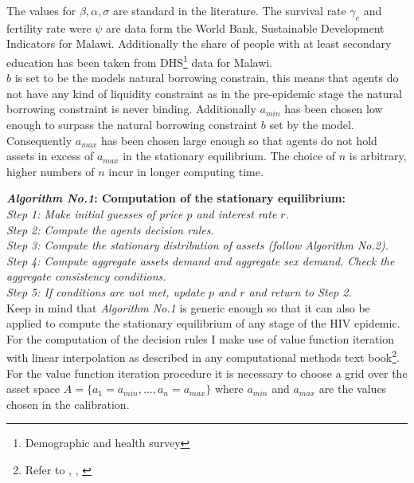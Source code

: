 The values for $\beta, \alpha, \sigma$ are standard in the literature. The survival rate $\gamma_{e}$ and fertility rate were $\psi$ are data form the World Bank, Sustainable Development Indicators for Malawi. Additionally the share of people with at least secondary education has been taken from DHS\footnote{Demographic and health survey} data for Malawi.\\

$b$ is set to be the models natural borrowing constrain, this means that agents do not have any kind of liquidity constraint as in the pre-epidemic stage the natural borrowing constraint is never binding. Additionally $a_{min}$ has been chosen low enough to surpass the natural borrowing constraint $b$ set by the model. Consequently $a_{max}$ has been chosen large enough so that agents do not hold assets in excess of $a_{max}$ in the stationary equilibrium. The choice of $n$ is arbitrary, higher numbers of $n$ incur in longer computing time.

\noindent \textbf{\textit{Algorithm No.1}: Computation of the stationary equilibrium:}\\

\noindent\textit{Step 1: Make initial guesses of price $p$ and interest rate $r$.\\
Step 2: Compute the agents decision rules.\\
Step 3: Compute the stationary distribution of assets (follow Algorithm No.2).\\
Step 4: Compute aggregate assets demand and aggregate sex demand. Check the aggregate consistency conditions.\\
Step 5: If conditions are not met, update $p$ and $r$ and return to Step 2. 
}\\

Keep in mind that \textit{Algorithm No.1} is generic enough so that it can also be applied to compute the stationary equilibrium of any stage of the HIV epidemic.\\

For the computation of the decision rules I make use of value function iteration with linear interpolation as described in any computational methods text book\footnote{Refer to \cite{mauss}, \cite{judd}, \cite{sargent}}. For the value function iteration procedure it is necessary to choose a grid over the asset space $A=\{a_{1}=a_{min},...,a_{n}=a_{max}\}$ where $a_{min}$ and $a_{max}$ are the values chosen in the calibration. \\

